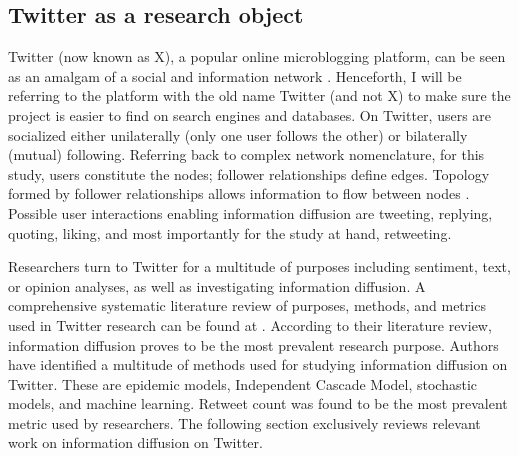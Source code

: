 \documentclass[11pt,a4paper]{article}
\begin{document}
    \subsection{Twitter as a research object}
    Twitter (now known as X), a popular online microblogging platform, can be seen as an amalgam of a social and information network \cite{myers_information_2014, kwak_what_2010}. Henceforth, I will be referring to the platform with the old name Twitter (and not X) to make sure the project is easier to find on search engines and databases. On Twitter, users are socialized either unilaterally (only one user follows the other) or bilaterally (mutual) following. Referring back to complex network nomenclature, for this study, users constitute the nodes; follower relationships define edges. Topology formed by follower relationships allows information to flow between nodes \cite{myers_information_2014}. Possible user interactions enabling information diffusion are tweeting, replying, quoting, liking, and most importantly for the study at hand, retweeting.
    
    Researchers turn to Twitter for a multitude of purposes including sentiment, text, or opinion analyses, as well as investigating information diffusion. A comprehensive systematic literature review of purposes, methods, and metrics used in Twitter research can be found at \cite{firdaniza_information_2021}. According to their literature review, information diffusion proves to be the most prevalent research purpose. Authors have identified a multitude of methods used for studying information diffusion on Twitter. These are epidemic models, Independent Cascade Model, stochastic models, and machine learning. Retweet count was found to be the most prevalent metric used by researchers. The following section exclusively reviews relevant work on information diffusion on Twitter.
\end{document}
